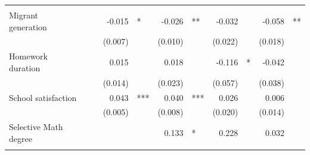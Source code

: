 \documentclass{article}
\begin{document}
\begin{table}[!h]
\begin{tabular}{lllllllllll}
  \multicolumn{1}{l}{} \\
\multicolumn{1}{l}{Migrant generation} &
  \multicolumn{1}{r}{} &
  \multicolumn{1}{l}{} &
  \multicolumn{1}{r}{-0.015} &
  \multicolumn{1}{l}{*} &
  \multicolumn{1}{r}{-0.026} &
  \multicolumn{1}{l}{**} &
  \multicolumn{1}{r}{-0.032} &
  \multicolumn{1}{l}{} &
  \multicolumn{1}{r}{-0.058} &
  \multicolumn{1}{l}{**} \\
\multicolumn{1}{l}{} &
  \multicolumn{1}{r}{} &
  \multicolumn{1}{l}{} &
  \multicolumn{1}{r}{(0.007)} &
  \multicolumn{1}{l}{} &
  \multicolumn{1}{r}{(0.010)} &
  \multicolumn{1}{l}{} &
  \multicolumn{1}{r}{(0.022)} &
  \multicolumn{1}{l}{} &
  \multicolumn{1}{r}{(0.018)} &
  \multicolumn{1}{l}{} \\
\multicolumn{1}{l}{Homework duration} &
  \multicolumn{1}{r}{} &
  \multicolumn{1}{l}{} &
  \multicolumn{1}{r}{0.015} &
  \multicolumn{1}{l}{} &
  \multicolumn{1}{r}{0.018} &
  \multicolumn{1}{l}{} &
  \multicolumn{1}{r}{-0.116} &
  \multicolumn{1}{l}{*} &
  \multicolumn{1}{r}{-0.042} &
  \multicolumn{1}{l}{} \\
\multicolumn{1}{l}{} &
  \multicolumn{1}{r}{} &
  \multicolumn{1}{l}{} &
  \multicolumn{1}{r}{(0.014)} &
  \multicolumn{1}{l}{} &
  \multicolumn{1}{r}{(0.023)} &
  \multicolumn{1}{l}{} &
  \multicolumn{1}{r}{(0.057)} &
  \multicolumn{1}{l}{} &
  \multicolumn{1}{r}{(0.038)} &
  \multicolumn{1}{l}{} \\
\multicolumn{1}{l}{School satisfaction} &
  \multicolumn{1}{r}{} &
  \multicolumn{1}{l}{} &
  \multicolumn{1}{r}{0.043} &
  \multicolumn{1}{l}{***} &
  \multicolumn{1}{r}{0.040} &
  \multicolumn{1}{l}{***} &
  \multicolumn{1}{r}{0.026} &
  \multicolumn{1}{l}{} &
  \multicolumn{1}{r}{0.006} &
  \multicolumn{1}{l}{} \\
\multicolumn{1}{l}{} &
  \multicolumn{1}{r}{} &
  \multicolumn{1}{l}{} &
  \multicolumn{1}{r}{(0.005)} &
  \multicolumn{1}{l}{} &
  \multicolumn{1}{r}{(0.008)} &
  \multicolumn{1}{l}{} &
  \multicolumn{1}{r}{(0.020)} &
  \multicolumn{1}{l}{} &
  \multicolumn{1}{r}{(0.014)} &
  \multicolumn{1}{l}{} \\
\multicolumn{1}{l}{Selective Math degree} &
  \multicolumn{1}{r}{} &
  \multicolumn{1}{l}{} &
  \multicolumn{1}{r}{} &
  \multicolumn{1}{l}{} &
  \multicolumn{1}{r}{0.133} &
  \multicolumn{1}{l}{*} &
  \multicolumn{1}{r}{0.228} &
  \multicolumn{1}{l}{} &
  \multicolumn{1}{r}{0.032} &
  \multicolumn{1}{l}{} \\
\multicolumn{1}{l}{} &
  \multicolumn{1}{r}{} &
  \multicolumn{1}{l}{} &
  \multicolumn{1}{r}{} &

\end{tabular}
\end{table}
\end{document}
